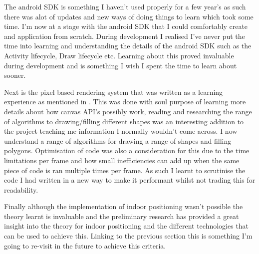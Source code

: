 The android SDK is something I haven't used properly for a few year's as such there was alot of updates and new ways of doing things to learn which took some time. I'm now at a stage with the android SDK that I could comfortably create and application from scratch. During development I realised I've never put the time into learning and understanding the details of the android SDK such as the Activity lifecycle, Draw lifecycle etc. Learning about this proved invaluable during development and is something I wish I spent the time to learn about sooner.

Next is the pixel based rendering system that was written as a learning experience as mentioned in \citetemp. This was done with soul purpose of learning more details about how canvas API's possibly work, reading and researching the range of algorithms to drawing/filling different shapes was an interesting addition to the project teaching me information I normally wouldn't come across. I now understand a range of algorithms for drawing a range of shapes and filling polygons. Optimisation of code was also a consideration for this due to the time limitations per frame and how small inefficiencies can add up when the same piece of code is ran multiple times per frame. As such I learnt to scrutinise the code I had written in a new way to make it performant whilst not trading this for readability.

Finally although the implementation of indoor positioning wasn't possible the theory learnt is invaluable and the preliminary research has provided a great insight into the theory for indoor positioning and the different technologies that can be used to achieve this. Linking to the previous section this is something I'm going to re-visit in the future to achieve this criteria.


